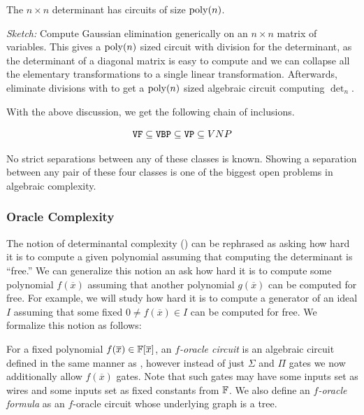 \documentclass[letterpaper, 11pt]{amsart}
\begin{document}
\begin{prop}\label{prop:det_poly_ckt}
  The $n \times n$ determinant has circuits of size $\operatorname{poly}(n)$.
\end{prop}
\begin{pf}
  \emph{Sketch:}
  Compute Gaussian elimination generically on an $n \times n$ matrix of variables.
  This gives a $\operatorname{poly}(n)$ sized circuit with division for the determinant, as the determinant of a diagonal matrix is easy to compute and we can collapse all the elementary transformations to a single linear transformation.
  Afterwards, eliminate divisions with  to get a $\operatorname{poly}(n)$ sized algebraic circuit computing $\det_n$.
\end{pf}

With the above discussion, we get the following chain of inclusions.
\begin{prop}
  \[
    \operatorname{\texttt{VF}} \subseteq \operatorname{\texttt{VBP}} \subseteq \operatorname{\texttt{VP}} \subseteq VNP
  \]
\end{prop}
No strict separations between any of these classes is known.
Showing a separation between any pair of these four classes is one of the biggest open problems in algebraic complexity.
\fi

\subsubsection{Oracle Complexity}

The notion of determinantal complexity () can be rephrased as asking how hard it is to compute a given polynomial assuming that computing the determinant is ``free.''%
We can generalize this notion an ask how hard it is to compute some polynomial $f(\overline{x})$ assuming that another polynomial $g(\overline{x})$ can be computed for free.
For example, we will study how hard it is to compute a generator of an ideal $I$ assuming that some fixed $0 \neq f(\overline{x}) \in I$ can be computed for free.
We formalize this notion as follows:

\begin{defn}\label{defn:oracle_ckt}
  For a fixed polynomial $f(\overline{x}) \in \mathbb{F}[\overline{x}]$, an \emph{$f$-oracle circuit} is an algebraic circuit defined in the same manner as , however instead of just $\Sigma$ and $\Pi$ gates we now additionally allow $f(\overline{x})$ gates.
  Note that such gates may have some inputs set as wires and some inputs set as fixed constants from $\mathbb{F}$.
  We also define an \emph{$f$-oracle formula} as an $f$-oracle circuit whose underlying graph is a tree.
\end{defn}
\end{document}
